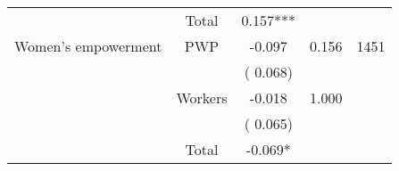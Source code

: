\begin{tabular}{l*{4}{c}}
\cmidrule{2-3}
                               &       Total           &              0.157***               &   &                                               \\ 
\cmidrule{2-3}
 Women's empowerment                &       PWP     &             -0.097               &        0.156   & 1451                              \\ 
                               &                               &       (       0.068)                     & &                                                                             \\ 
                               &       Workers         &             -0.018               &        1.000   &                                               \\ 
                               &                               &       (       0.065)                     & &                                                                             \\ 
\cmidrule{2-3}
                               &       Total           &             -0.069*               &   &                                               \\ 
\cmidrule{2-3}
\hline \end{tabular}                                                                                                              